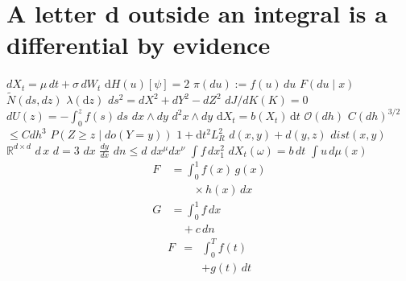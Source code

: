 \documentclass{article}
\begin{document}
\section{A letter d outside an integral is a differential by evidence}
$dX_t=\mu\,dt+\sigma\,dW_t$ $\mathrm{d}H(u)[\psi]=2$ $\pi(du):=f(u)\,du$ $F(du\mid x)$ $\widetilde N(ds,dz)$ $\lambda(\mathrm{d}z)$
$ds^2=dX^2+dY^2-dZ^2$ $dJ/dK(K)=0$ $dU(z)=-\int_0^z f(s)\,ds$ $dx\wedge dy$ $d^2x\wedge dy$ $\mathrm{d}X_t=b(X_t)\,\mathrm{d}t$
$\mathcal{O}(dh)$ $C(dh)^{3/2}$ $\leq Cdh^3$ $P(Z\geq z\mid do(Y=y))$ $1+\mathrm{d}t^2L_R^2$ $d(x,y)+d(y,z)$ $dist(x,y)$
$\mathbb{R}^{d\times d}$ $d\,x$ $d=3$ $dx$ $\frac{dy}{dx}$ $dn\leq d$
$dx^\mu dx^\nu$ $\int f\,dx_1^2$ $dX_t(\omega)=b\,dt$ $\int u\,d\mu(x)$
\begin{align*}
F &= \int_0^1 f(x)\,g(x) \\
  &\qquad\times h(x)\,dx \\
G &= \int_0^1 f\,dx \\
  &\quad+c\,dn
\end{align*}
\begin{eqnarray}
F &=& \int_0^T f(t)\nonumber\\
  && +g(t)\,dt
\end{eqnarray}
\end{document}
